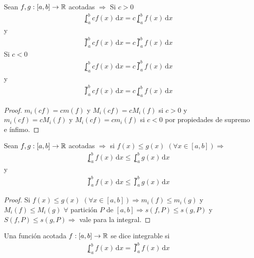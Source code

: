 \begin{prop}
  Sean \(f, g: [a, b] \to \mathbb{R} \) acotadas \(\Rightarrow \)
  Si \(c > 0\) \begin{align*}
    \lowint_a^b c f(x)\,\mathrm{d}x = c \lowint_a^b f(x)\,\mathrm{d}x
  \end{align*} y \begin{align*}
    \upint_a^b c f(x)\, \mathrm{d}x = c \upint_a^b f(x)\, \mathrm{d}x
  \end{align*}
  Si \(c < 0\) \begin{align*}
    \lowint_a^b c f(x)\,\mathrm{d}x = c \upint_a^b f(x)\,\mathrm{d}x
  \end{align*} y \begin{align*}
    \upint_a^b c f(x)\,\mathrm{d}x = c \lowint_a^b f(x)\,\mathrm{d}x
  \end{align*}
  \begin{proof}
    \(m_i(c f) = c m(f)\) y \(M_i(c f) = c M_i(f)\) si \(c > 0\) y \(m_i(c f) = c M_i(f)\) y \(M_i(c f) = c m_i(f)\) si \(c < 0\) por propiedades de supremo e ínfimo.
  \end{proof}
\end{prop}

\begin{prop}
  Sean \(f, g: [a, b] \to \mathbb{R} \) acotadas \(\Rightarrow \) si \(f(x) \leq g(x)\) \((\forall x \in [a, b]) \Rightarrow \) \begin{align*}
    \lowint_a^b f(x)\,\mathrm{d}x \leq \lowint_a^b g(x)\,\mathrm{d}x
  \end{align*} y \begin{align*}
    \upint_a^b f(x)\, \mathrm{d}x \leq \upint_a^b g(x)\, \mathrm{d}x
  \end{align*}
  \begin{proof}
    Si \(f(x) \leq g(x)\) \((\forall x \in [a, b]) \Rightarrow m_i(f) \leq m_i(g)\) y \(M_i(f) \leq M_i(g)\) \(\forall \) partición \(P\) de \([a, b] \Rightarrow s(f, P) \leq s(g, P)\) y \(S(f, P) \leq s(g, P) \Rightarrow \) vale para la integral.
  \end{proof}
\end{prop}

\begin{definition}[Integrable]
  Una función acotada \(f: [a, b] \to \mathbb{R} \) se dice integrable si \begin{align*}
    \lowint_a^b f(x) \, \mathrm{d}x = \upint_a^b f(x) \, \mathrm{d}x
  \end{align*}
\end{definition}

